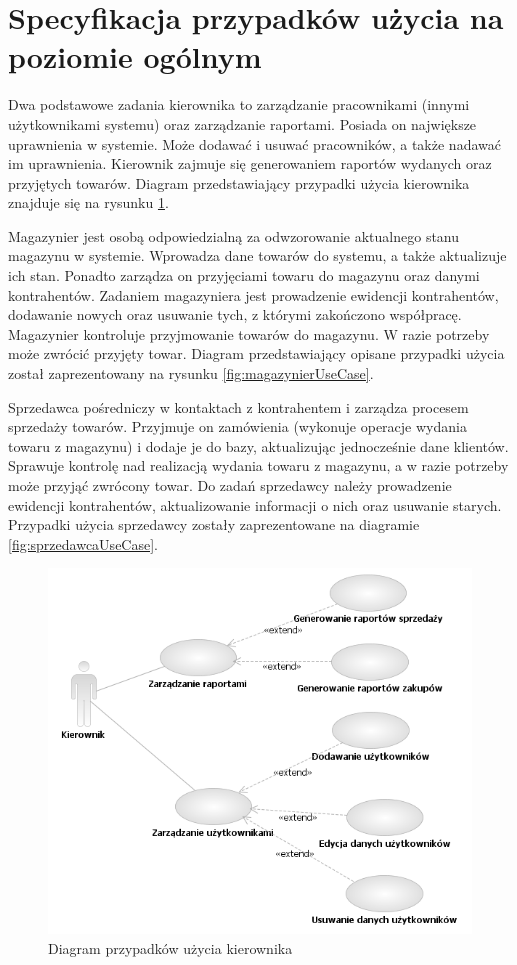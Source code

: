 \section{Specyfikacja przypadków użycia na poziomie ogólnym}

Dwa podstawowe zadania kierownika to zarządzanie pracownikami (innymi użytkownikami systemu) oraz zarządzanie raportami. Posiada on największe uprawnienia
w systemie. Może dodawać i usuwać pracowników, a także nadawać im uprawnienia. Kierownik zajmuje się generowaniem raportów wydanych oraz przyjętych towarów.  Diagram przedstawiający przypadki użycia kierownika znajduje
się na rysunku \ref{fig:kierownikUseCase}.

Magazynier jest osobą odpowiedzialną za odwzorowanie aktualnego stanu
magazynu w systemie. Wprowadza dane towarów do systemu, a także
aktualizuje ich stan. Ponadto zarządza on przyjęciami towaru do
magazynu oraz danymi kontrahentów.  Zadaniem magazyniera jest
prowadzenie ewidencji kontrahentów, dodawanie nowych oraz usuwanie
tych, z którymi zakończono współpracę. Magazynier kontroluje
przyjmowanie towarów do magazynu.  W razie potrzeby może zwrócić
przyjęty towar. Diagram przedstawiający opisane przypadki użycia
został zaprezentowany na rysunku \ref{fig:magazynierUseCase}.

Sprzedawca pośredniczy w kontaktach z kontrahentem i zarządza procesem
sprzedaży towarów. Przyjmuje on zamówienia (wykonuje operacje wydania
towaru z magazynu) i dodaje je do bazy, aktualizując jednocześnie dane
klientów. Sprawuje kontrolę nad realizacją wydania towaru z magazynu,
a w razie potrzeby może przyjąć zwrócony towar. Do zadań sprzedawcy
należy prowadzenie ewidencji kontrahentów, aktualizowanie informacji o
nich oraz usuwanie starych. Przypadki użycia sprzedawcy zostały
zaprezentowane na diagramie \ref{fig:sprzedawcaUseCase}.

\begin{figure}[ht]
  \begin{center}
    \includegraphics[angle=-90,scale=0.8]{../img/kierownikUseCase.png}
  \end{center}
  \caption{Diagram przypadków użycia kierownika}
  \label{fig:kierownikUseCase}
\end{figure}


